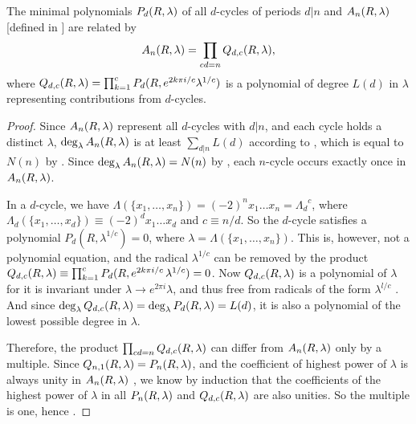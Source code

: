 \documentclass[preprint]{revtex4-1}
\begin{document}
\begin{theorem}
The minimal polynomials $P_d(R, \lambda)$ of all $d$-cycles
  of periods $d|n$
and $A_n(R, \lambda)$ [defined in ] are related by
  \begin{equation}
    A_n(R, \lambda) = \prod_{cd = n} Q_{d, c}(R, \lambda),
    \label{eq:prod}
  \end{equation}
  where
  $Q_{d,c}(R, \lambda) = \prod_{k=1}^{c} P_d(R, e^{2 k \pi i/c} \lambda^{1/c})$
  is a polynomial of degree $L(d)$ in $\lambda$
  representing contributions from $d$-cycles.
\label{thm:prod}
\end{theorem}

\begin{proof}
Since $A_n(R, \lambda)$ represent all $d$-cycles with $d|n$,
and each cycle holds a distinct $\lambda$,
  $\deg_\lambda A_n(R, \lambda)$
  is at least $\sum_{d|n} L(d)$
  according to ,
  which is equal to
  $N(n)$ by .
Since $\deg_\lambda A_n(R, \lambda) = N(n)$ by ,
  each $n$-cycle occurs exactly once in $A_n(R, \lambda)$.


In a $d$-cycle,
 we have $\Lambda(\{x_1, \ldots, x_n\}) = (-2)^n x_1 \dots x_n
   = {\Lambda_d}^c$,
where
$\Lambda_d(\{x_1, \ldots, x_d\}) \equiv (-2)^d x_1 \dots x_d$
and
$c \equiv n/d$.
So the $d$-cycle satisfies a polynomial
  $P_d(R, \lambda^{1/c}) = 0$,
where $\lambda = \Lambda(\{x_1,\ldots,x_n\})$.
%
This is, however, not a polynomial equation, and
%
the radical $\lambda^{1/c}$ can be removed by the product
$Q_{d,c}(R, \lambda)
  \equiv \prod_{k=1}^c P_d(R, e^{2k\pi i/c} \, \lambda^{1/c}) = 0$.
%
Now $Q_{d,c}(R, \lambda)$ is a polynomial of $\lambda$
  for it is invariant under
  $\lambda \rightarrow e^{2\pi i} \lambda$,
and thus free from radicals of the form $\lambda^{l/c}$
  \big[if $(l, c) \ne c$\big].
And since
  $\deg_\lambda Q_{d,c}(R, \lambda)
    = \deg_\lambda P_d(R, \lambda) = L(d)$,
  it is also a polynomial
  of the lowest possible degree in $\lambda$.


Therefore, the product $\prod_{cd=n} Q_{d,c}(R, \lambda)$
  can differ from $A_n(R, \lambda)$ only by
  a multiple.
Since $Q_{n,1}(R, \lambda) = P_n(R, \lambda)$,
  and the coefficient of highest power of $\lambda$ is always
  unity in $A_n(R, \lambda)$ ,
  we know by induction that the coefficients of the highest power of $\lambda$
  in all $P_n(R, \lambda)$ and $Q_{d,c}(R, \lambda)$
  are also unities.
So the multiple is one, hence .
%
%
%
\end{proof}
\end{document}
